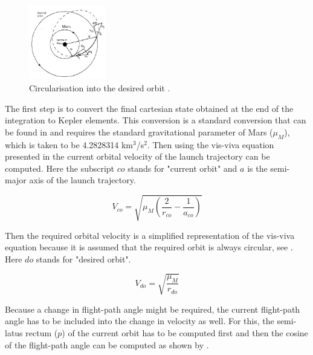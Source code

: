 

\begin{figure}[H]
\centering
\includegraphics[width=0.3\textwidth]{figures/circularisation/deltaVcircularOrbitMars_wakker2010.png}
\caption{Circularisation into the desired orbit \citep{wakker2010}.}
\label{fig:deltaVcircularOrbitMars_wakker2010}
\end{figure}

\noindent
The first step is to convert the final cartesian state obtained at the end of the integration to Kepler elements. This conversion is a standard conversion that can be found in \cite{wakker2010} and requires the standard gravitational parameter of Mars ($\mu_{M}$), which is taken to be 4.2828314 km$^{3}$/s$^{2}$. Then using the vis-viva equation presented in  the current orbital velocity of the launch trajectory can be computed. Here the subscript $co$ stands for "current orbit" and $a$ is the semi-major axis of the launch trajectory.

\begin{equation} \label{eq:visViva}
V_{co} = \sqrt{\mu_{M}\left(\dfrac{2}{r_{co}}-\dfrac{1}{a_{co}}\right)}
\end{equation}


\noindent
Then the required orbital velocity is a simplified representation of the vis-viva equation because it is assumed that the required orbit is always circular, see . Here $do$ stands for "desired orbit".

\begin{equation} \label{eq:simpVisViva}
V_{do}=\sqrt{\dfrac{\mu_{M}}{r_{do}}}
\end{equation} 

\noindent
Because a change in flight-path angle might be required, the current flight-path angle has to be included into the change in velocity as well. For this, the semi-latus rectum ($p$) of the current orbit has to be computed first and then the cosine of the flight-path angle can be computed as shown by .


